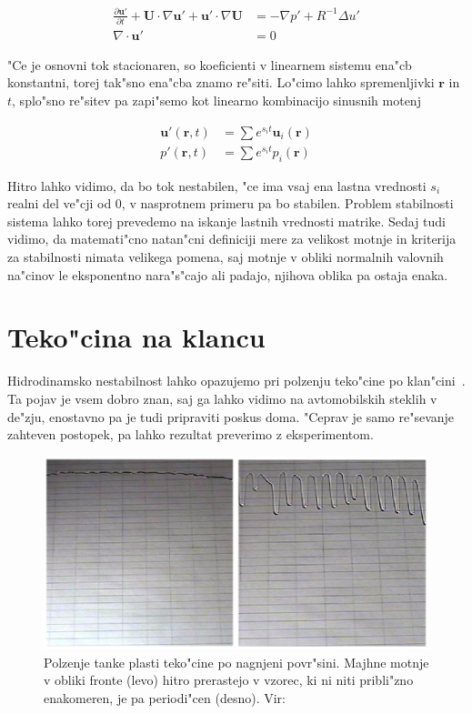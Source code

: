 \documentclass[a4paper,10pt]{article}
\renewcommand{\vec}{\mathbf}
\newcommand{\rt}{(\vec r, t)}
\begin{document}
\begin{align}
 \label{eq:ns-linearna}
\frac{\partial \vec u'}{\partial t} + \vec U \cdot \nabla \vec u' + \vec u' \cdot \nabla \vec U &= -\nabla p' + R^{-1}\Delta u' \\
\label{eq:nestisljivost-linearna}
\nabla \cdot \vec u' &= 0
\end{align}

"Ce je osnovni tok stacionaren, so koeficienti v linearnem sistemu ena"cb konstantni, torej tak"sno ena"cba znamo re"siti. Lo"cimo lahko spremenljivki $\vec r$ in $t$, splo"sno re"sitev pa zapi"semo kot linearno kombinacijo sinusnih motenj

\begin{align}
 \vec u'\rt &= \sum e^{s_i t} \vec u_i(\vec r) \\
 p'\rt &= \sum e^{s_i t} p_i(\vec r)
\end{align}

Hitro lahko vidimo, da bo tok nestabilen, "ce ima vsaj ena lastna vrednosti $s_i$ realni del ve"cji od 0, v nasprotnem primeru pa bo stabilen. Problem stabilnosti sistema lahko torej prevedemo na iskanje lastnih vrednosti matrike. Sedaj tudi vidimo, da matemati"cno natan"cni definiciji mere za velikost motnje in kriterija za stabilnosti nimata velikega pomena, saj motnje v obliki normalnih valovnih na"cinov le eksponentno nara"s"cajo ali padajo, njihova oblika pa ostaja enaka. 

\section{Teko"cina na klancu}

Hidrodinamsko nestabilnost lahko opazujemo pri polzenju teko"cine po klan"cini~\cite{kondic}. Ta pojav je vsem dobro znan, saj ga lahko vidimo na avtomobilskih steklih v de"zju, enostavno pa je tudi pripraviti poskus doma. "Ceprav je samo re"sevanje zahteven postopek, pa lahko rezultat preverimo z eksperimentom. 

\begin{figure}[h]
\centering
 \includegraphics[width=.9\textwidth]{./Slike/film-slika}
\caption{Polzenje tanke plasti teko"cine po nagnjeni povr"sini. Majhne motnje v obliki fronte (levo) hitro prerastejo v vzorec, ki ni niti pribli"zno enakomeren, je pa periodi"cen (desno). Vir: \cite{kondic}}
\label{fig:film-neenakomernost}
\end{figure}
\end{document}
